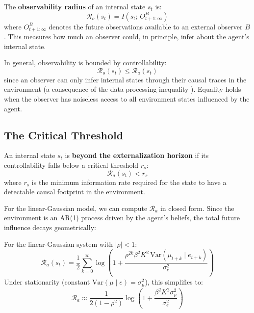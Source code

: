\documentclass[runningheads]{llncs}
\begin{document}
\begin{definition}[Observability]
The \textbf{observability radius} of an internal state $s_t$ is:
\begin{equation}
    \mathcal{R}_o(s_t) = I(s_t; \, O^B_{t+1:\infty})
    \label{eq:observability}
\end{equation}
where $O^B_{t+1:\infty}$ denotes the future observations available to an external observer $B$. This measures how much an observer could, in principle, infer about the agent's internal state.
\end{definition}

In general, observability is bounded by controllability:
\begin{equation}
    \mathcal{R}_o(s_t) \leq \mathcal{R}_a(s_t)
    \label{eq:obs_leq_ctrl}
\end{equation}
since an observer can only infer internal states through their causal traces in the environment (a consequence of the data processing inequality \cite{cover2006elements}). Equality holds when the observer has noiseless access to all environment states influenced by the agent.

\subsection{The Critical Threshold}

\begin{definition}
An internal state $s_t$ is \textbf{beyond the externalization horizon} if its controllability falls below a critical threshold $r_s$:
\begin{equation}
    \mathcal{R}_a(s_t) < r_s
    \label{eq:horizon_condition}
\end{equation}
where $r_s$ is the minimum information rate required for the state to have a detectable causal footprint in the environment.
\end{definition}

For the linear-Gaussian model, we can compute $\mathcal{R}_a$ in closed form. Since the environment is an AR(1) process driven by the agent's beliefs, the total future influence decays geometrically:

\begin{proposition}
\label{prop:controllability}
For the linear-Gaussian system with $|\rho| < 1$:
\begin{equation}
    \mathcal{R}_a(s_t) = \frac{1}{2} \sum_{k=0}^{\infty} \log \left(1 + \frac{\rho^{2k} \beta^2 K^2 \, \mathrm{Var}(\mu_{t+k} \mid e_{t+k})}{\sigma_e^2} \right)
    \label{eq:controllability_series}
\end{equation}
Under stationarity (constant $\mathrm{Var}(\mu \mid e) = \sigma_\mu^2$), this simplifies to:
\begin{equation}
    \mathcal{R}_a \approx \frac{1}{2(1-\rho^2)} \log \left( 1 + \frac{\beta^2 K^2 \sigma_\mu^2}{\sigma_e^2} \right)
    \label{eq:controllability_approx}
\end{equation}
\end{proposition}
\end{document}
